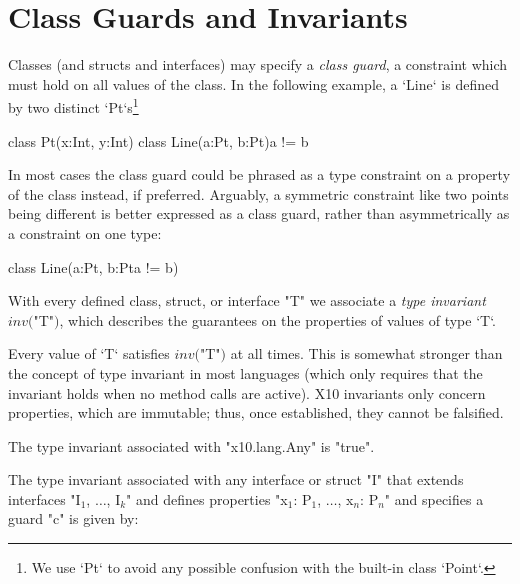 \section{Class Guards and Invariants}\label{DepType:ClassGuard}


Classes (and structs and interfaces) may specify a {\em class guard}, a
constraint which must hold on all values of the class.    In the following
example, a \xcd`Line` is defined by two distinct \xcd`Pt`s\footnote{We use \xcd`Pt`
to avoid any possible confusion with the built-in class \xcd`Point`.}
\begin{xten}
class Pt(x:Int, y:Int){}
class Line(a:Pt, b:Pt){a != b} {}
\end{xten}
%

In most cases the class guard could be phrased as a type constraint on a property of
the class instead, if preferred.  Arguably, a symmetric constraint like two
points being different is better expressed as a class guard, rather than
asymmetrically as a constraint on one type: 
\begin{xten}
class Line(a:Pt, b:Pt{a != b}) {}
\end{xten}
%



\label{DepType:TypeInvariant}
\label{DepType:ClassGuardDef}



With every defined class, struct,  or interface \xcd"T" we associate a {\em type
invariant} $\mathit{inv}($\xcd"T"$)$, which describes the guarantees on the
properties of values of type \xcd`T`.  

Every value of \xcd`T` satisfies $\mathit{inv}($\xcd"T"$)$ at all times.  This
is somewhat stronger than the concept of type invariant in most languages
(which only requires that the invariant holds when no method calls are
active).  X10 invariants only concern properties, which are immutable; thus,
once established, they cannot be falsified.

The type
invariant associated with \xcd"x10.lang.Any"
is 
\xcd"true".

The type invariant associated with any interface or struct \xcd"I" that extends
interfaces \xcdmath"I$_1$, $\dots$, I$_k$" and defines properties
\xcdmath"x$_1$: P$_1$, $\dots$, x$_n$: P$_n$" and
specifies a guard \xcd"c" is given by:

